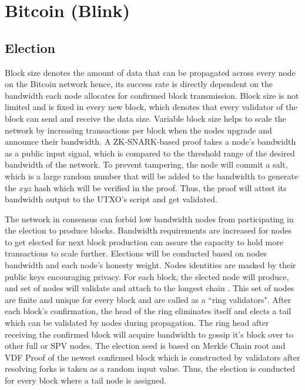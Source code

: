 \documentclass[../Bitcoin Blink.tex]{subfiles}
\begin{document}
\section{Bitcoin (Blink)} 
\subsection{Election}
Block size denotes the amount of data that can be propagated across every node on the Bitcoin network hence, its success rate is directly dependent on the bandwidth each node allocates for confirmed block transmission. Block size is not limited and is fixed in every new block, which denotes that every validator of the block can send and receive the data size. Variable block size helps to scale the network by increasing transactions per block when the nodes upgrade and announce their bandwidth. A ZK-SNARK-based proof takes a node’s bandwidth as a public input signal, which is compared to the threshold range of the desired bandwidth of the network. To prevent tampering, the node will commit a salt, which is a large random number that will be added to the bandwidth to generate the $xyz$ hash which will be verified in the proof. Thus, the proof will attest its bandwidth output to the UTXO’s script and get validated. 

The network in consensus can forbid low bandwidth nodes from participating in the election to produce blocks. Bandwidth requirements are increased for nodes to get elected for next block production can assure the capacity to hold more transactions to scale further. Elections will be conducted based on nodes bandwidth and each node's honesty weight. Nodes identities are masked by their public keys encouraging privacy. For each block, the elected node will produce, and set of nodes will validate and attach to the longest chain \cite{nakamoto2008bitcoin} . This set of nodes are finite and unique for every block and are called as a ``ring validators". After each block's confirmation, the head of the ring eliminates itself and elects a tail which can be validated by nodes during propagation. The ring head after receiving the confirmed block will acquire bandwidth to gossip it's block over to other full or SPV nodes. The election seed is based on Merkle Chain root and VDF Proof \cite{yakovenko2018solana} of the newest confirmed block which is constructed by validators after resolving forks is taken as a random input value. Thus, the election is conducted for every block where a tail node is assigned.
\end{document}
